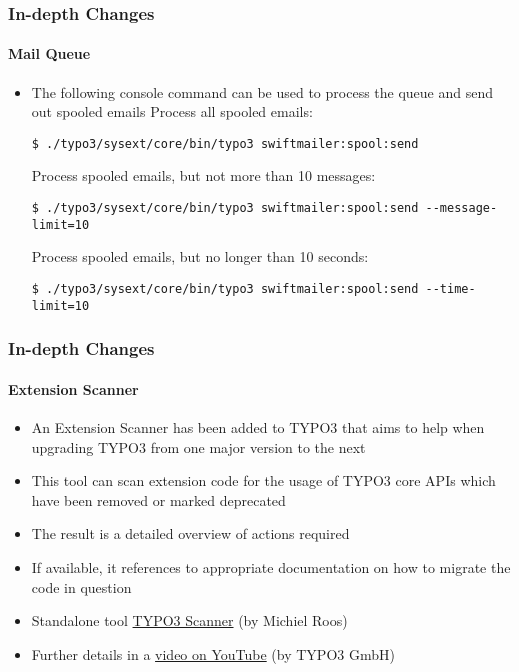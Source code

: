 \begin{frame}[fragile]
	\frametitle{In-depth Changes}
	\framesubtitle{Mail Queue}

	\lstset{basicstyle=\tiny\ttfamily}

	\begin{itemize}
		\item The following console command can be used to process the queue and send
			out spooled emails
			\newline\newline
			\small
				Process all spooled emails:
			\normalsize
\begin{lstlisting}
$ ./typo3/sysext/core/bin/typo3 swiftmailer:spool:send
\end{lstlisting}

			\small
				Process spooled emails, but not more than 10 messages:
			\normalsize
\begin{lstlisting}
$ ./typo3/sysext/core/bin/typo3 swiftmailer:spool:send --message-limit=10
\end{lstlisting}

			\small
				Process spooled emails, but no longer than 10 seconds:
			\normalsize
\begin{lstlisting}
$ ./typo3/sysext/core/bin/typo3 swiftmailer:spool:send --time-limit=10
\end{lstlisting}

	\end{itemize}

\end{frame}


\begin{frame}[fragile]
	\frametitle{In-depth Changes}
	\framesubtitle{Extension Scanner}

	\begin{itemize}
		\item An Extension Scanner has been added to TYPO3 that aims to help
			when upgrading TYPO3 from one major version to the next
		\item This tool can scan extension code for the usage of TYPO3 core
			APIs which have been removed or marked deprecated
		\item The result is a detailed overview of actions required
		\item If available, it references to appropriate documentation on how to
			migrate the code in question
		\item Standalone tool \href{https://github.com/Tuurlijk/typo3scan}{TYPO3 Scanner}
			(by Michiel Roos)
		\item Further details in a \href{https://www.youtube.com/watch?v=UdIYDZgBrQU}{video on YouTube}
			(by TYPO3 GmbH)
	\end{itemize}

\end{frame}

